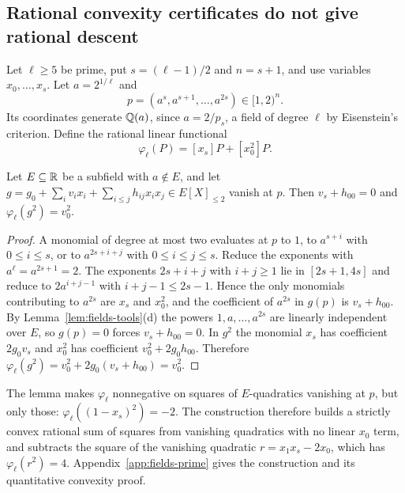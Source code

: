 \subsection{Rational convexity certificates do not give rational descent}
\label{sec:fields-prime}

Let $\ell\ge5$ be prime, put $s=(\ell-1)/2$ and $n=s+1$, and use variables
$x_0,\ldots,x_s$. Let $a=2^{1/\ell}$ and
\[
 p=(a^s,a^{s+1},\ldots,a^{2s})\in[1,2)^n .
\]
Its coordinates generate $\mathbb Q(a)$, since $a=2/p_s$, a field of degree $\ell$
by Eisenstein's criterion. Define the rational linear functional
\begin{equation}
 \varphi_\ell(P)=[x_s]P+[x_0^2]P .
 \label{eq:fields-prime-functional}
\end{equation}

\begin{lemma}
\label{lem:fields-prime-functional}
Let $E\subseteq\mathbb R$ be a subfield with $a\notin E$, and let
$g=g_0+\sum_iv_ix_i+\sum_{i\le j}h_{ij}x_ix_j\in E[X]_{\le2}$ vanish at
$p$. Then $v_s+h_{00}=0$ and $\varphi_\ell(g^2)=v_0^2$.
\end{lemma}

\begin{proof}
A monomial of degree at most two evaluates at $p$ to $1$, to $a^{s+i}$ with
$0\le i\le s$, or to $a^{2s+i+j}$ with $0\le i\le j\le s$. Reduce the
exponents with $a^\ell=a^{2s+1}=2$. The exponents $2s+i+j$ with $i+j\ge1$ lie
in $[2s+1,4s]$ and reduce to $2a^{i+j-1}$ with $i+j-1\le2s-1$. Hence the only
monomials contributing to $a^{2s}$ are $x_s$ and $x_0^2$, and the coefficient
of $a^{2s}$ in $g(p)$ is $v_s+h_{00}$. By Lemma~\ref{lem:fields-tools}(d) the
powers $1,a,\ldots,a^{2s}$ are linearly independent over $E$, so $g(p)=0$
forces $v_s+h_{00}=0$. In $g^2$ the monomial $x_s$ has coefficient
$2g_0v_s$ and $x_0^2$ has coefficient $v_0^2+2g_0h_{00}$. Therefore
$\varphi_\ell(g^2)=v_0^2+2g_0(v_s+h_{00})=v_0^2$.
\end{proof}

The lemma makes $\varphi_\ell$ nonnegative on squares of $E$-quadratics
vanishing at $p$, but only those: $\varphi_\ell((1-x_s)^2)=-2$. The
construction therefore builds a strictly convex rational sum of squares from
vanishing quadratics with no linear $x_0$ term, and subtracts the square of
the vanishing quadratic $r=x_1x_s-2x_0$, which has $\varphi_\ell(r^2)=4$.
Appendix~\ref{app:fields-prime} gives the construction and its quantitative
convexity proof.

